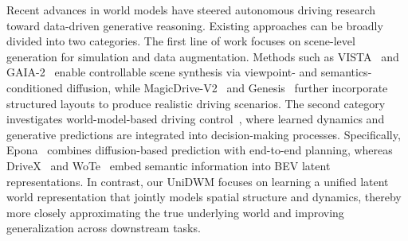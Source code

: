 Recent advances in world models have steered autonomous driving research toward data-driven generative reasoning. Existing approaches can be broadly divided into two categories. The first line of work focuses on scene-level generation for simulation and data augmentation. Methods such as VISTA~\cite{GaoVista2024} and GAIA-2~\cite{RussellGAIA22025} enable controllable scene synthesis via viewpoint- and semantics-conditioned diffusion, while MagicDrive-V2~\cite{magicdrivev2} and Genesis~\cite{guo2025genesis} further incorporate structured layouts to produce realistic driving scenarios. The second category investigates world-model-based driving control~\cite{epona,zheng2025world4drive,shi2025drivex,wote}, where learned dynamics and generative predictions are integrated into decision-making processes. Specifically, Epona~\cite{epona} combines diffusion-based prediction with end-to-end planning, whereas DriveX~\cite{shi2025drivex} and WoTe~\cite{wote} embed semantic information into BEV latent representations. In contrast, our UniDWM focuses on learning a unified latent world representation that jointly models spatial structure and dynamics, thereby more closely approximating the true underlying world and improving generalization across downstream tasks.


